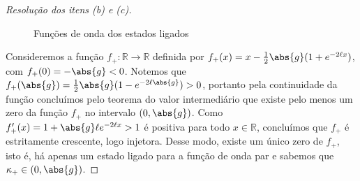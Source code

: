 \begin{proof}[Resolução dos itens (b) e (c)]
    \begin{figure}[!ht]
        \centering
        \caption{Funções de onda dos estados ligados}
    \end{figure}

    Consideremos a função \(f_+ : \mathbb{R} \to \mathbb{R}\) definida por \(f_+(x) = x - \frac12\abs{g}(1 + e^{-2\ell x})\), com \(f_+(0) = - \abs{g} < 0\). Notemos que \(f_+(\abs{g}) = \frac12\abs{g}(1 - e^{-2\ell \abs{g}}) > 0\), portanto pela continuidade da função concluímos pelo teorema do valor intermediário que existe pelo menos um zero da função \(f_+\) no intervalo \((0, \abs{g})\). Como \(f_+'(x) = 1 + \abs{g} \ell e^{-2\ell x} > 1\) é positiva para todo \(x \in \mathbb{R}\), concluímos que \(f_+\) é estritamente crescente, logo injetora. Desse modo, existe um único zero de \(f_+\), isto é, há apenas um estado ligado para a função de onda par e sabemos que \(\kappa_+ \in (0, \abs{g})\).


\end{proof}
